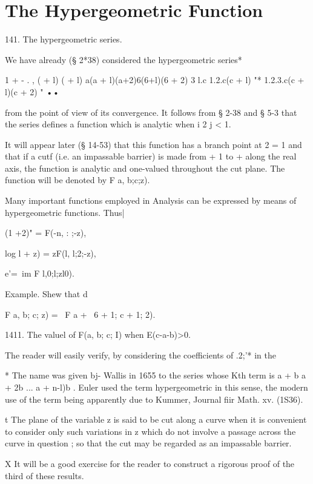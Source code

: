 \chapter{The Hypergeometric Function} 

141. The hypergeometric series. 

We have already (§ 2*38) considered the hypergeometric series* 

1 +  - . ,  (  + l) (  + l)   a(a + l)(a+2)6(6+l)(6 + 2) 3 
l.c 1.2.c(c + l)   "*  1.2.3.c(c + l)(c + 2)  " ••  

from the point of view of its convergence. It follows from § 2-38 and § 5-3 
that the series defines a function which is analytic when i 2  j < 1. 

It will appear later (§ 14-53) that this function has a branch point at 2 = 1 
and that if a cutf (i.e. an impassable barrier) is made from + 1 to +   along 
the real axis, the function is analytic and one-valued throughout the cut 
plane. The function will be denoted by F  a, b;c;z). 

Many important functions employed in Analysis can be expressed by 
means of hypergeometric functions. Thus| 

(1 +2)" = F(-n,  : ;-z), 

log l + z) = zF(l, l;2;-z), 

e'=\ im F l,0;l;zl0). 



Example. Shew that 
d 



F a, b; c; z) = ~F a + \, 6 + 1; c + 1; 2). 



1411. The valuel of F(a, b; c; I) when E(c-a-b)>0. 

The reader will easily verify, by considering the coefficients of .2;'* in the 

* The name was given bj- Wallis in 1655 to the series whose Kth term is 
a   + b   a + 2b  ...  a +  n-l)b . 
Euler used the term hypergeometric in this sense, the modern use of the term being apparently 
due to Kummer, Journal fiir Math. xv. (1S36). 

t The plane of the variable z is said to be cut along a curve when it is convenient to consider 
only such variations in z which do not involve a passage across the curve in question ; so that 
the cut may be regarded as an impassable barrier. 

X It will be a good exercise for the reader to construct a rigorous proof of the third of these 
results. 

